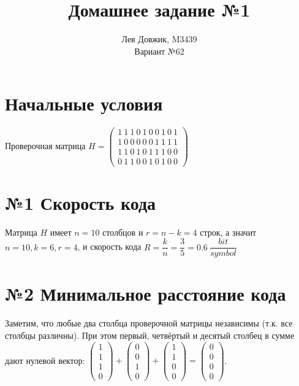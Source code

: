 \documentclass[fontsize=14pt]{article}
\title{Домашнее задание №1}
\author{Лев Довжик, M3439 \\ Вариант №62}
\date{}
\begin{document}
	\maketitle
	
\section*{Начальные условия}

	Проверочная матрица $H = 
 	\begin{pmatrix}
		1\ 1\ 1\ 0\ 1\ 0\ 0\ 1\ 0\ 1\\
		1\ 0\ 0\ 0\ 0\ 0\ 1\ 1\ 1\ 1\\
		1\ 1\ 0\ 1\ 0\ 1\ 1\ 1\ 0\ 0\\
		0\ 1\ 1\ 0\ 0\ 1\ 0\ 1\ 0\ 0
	\end{pmatrix}
	$
	
\section*{№1 Скорость кода}


	Матрица $H$ имеет $n = 10$ столбцов и $r = n - k = 4$ строк, а значит $n = 10, k = 6, r = 4$, и скорость кода $R = \dfrac{k}{n} = \dfrac{3}{5} = 0.6\ \dfrac{bit}{symbol}$ 

\section*{№2 Минимальное расстояние кода}

Заметим, что любые два столбца проверочной матрицы независимы (т.к. все столбцы различны). При этом первый, четвёртый и десятый столбец в сумме дают нулевой вектор: 
$\begin{pmatrix}1\\1\\1\\0\end{pmatrix} + \begin{pmatrix}0\\0\\1\\0\end{pmatrix} +  
\begin{pmatrix}1\\1\\0\\0\end{pmatrix} = \begin{pmatrix}0\\0\\0\\0\end{pmatrix}$.\\
\end{document}
